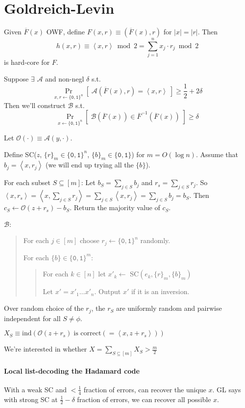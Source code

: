 \documentclass[11pt]{article}
\newcommand{\eqdef}{\ensuremath{\equiv}}
\newcommand{\bit}{\ensuremath{\{\texttt{0},\texttt{1}\}}}
\newcommand{\ang}[1]{\ensuremath{\left\langle#1\right\rangle}}
\newcommand{\abs}[1]{{\ensuremath{\left\vert#1\right\vert}}}
\newcommand{\AAA}{\ensuremath{\mathcal{A}}}
\newcommand{\BBB}{\ensuremath{\mathcal{B}}}
\newcommand{\OOO}{\ensuremath{\mathcal{O}}}
\theoremstyle{remark}
\begin{document}
\section{Goldreich-Levin}

Given $\overline{F}(x)$ OWF, define $F(x,r)\eqdef(\overline{F}(x), r)$ for $\abs{x}=\abs{r}$.
Then \[ h(x,r)\eqdef \ang{x,r} \bmod 2 = \sum_{j=1}^n x_j \cdot r_j \bmod 2 \]
is hard-core for $F$.

Suppose $\exists$ $\AAA$ and non-negl $\delta$ s.t. \[
\Pr_{x,r\gets\bit^n}[\;\AAA(\overline{F}(x), r) = \ang{x,r}\;] \ge \frac{1}{2} + 2\delta
\]
Then we'll construct $\BBB$ s.t. \[
\Pr_{x\gets\bit^n}[\;\BBB(\overline{F}(x)) \in \overline{F}^{-1}(\overline{F}(x))\;] \ge \delta
\]

Let $\OOO(\cdot) \eqdef \AAA(y, \cdot)$.

Define SC($z$, $\{r\}_m\in\bit^n$, $\{b\}_m\in\bit$) for $m = O(\log n)$.
Assume that $b_j=\ang{x,r_j}$ (we will end up trying all the $\{b\}$).

For each subset $S \subseteq [m]$: Let $b_S = \sum_{j\in S} b_j$ and $r_s = \sum_{j\in S} r_j$.
So $\ang{x,r_s} = \ang{x,\sum_{j\in S} r_j} = \sum_{j\in S}\ang{x,r_j} = \sum_{j\in S} b_j = b_S$.
Then $c_S \gets \OOO(z+r_s) - b_S$. Return the majority value of $c_S$.

$\BBB$:
\begin{quote}
For each $j\in[m]$ choose $r_j\gets\bit^n$ randomly.

For each $\{b\}\in\bit^m$:
\begin{quote}
For each $k\in[n]$ let $x'_k \gets$ SC$(e_k, \{r\}_m, \{b\}_m)$

Let $x' = x'_1 \ldots x'_n$. Output $x'$ if it is an inversion.
\end{quote}
\end{quote}

Over random choice of the $r_j$, the $r_S$ are uniformly random
and pairwise independent for all $S \neq \phi$.

$X_S \eqdef \text{ind}(\OOO(z+r_s)\;\text{is correct}(=\ang{x,z+r_s}))$

We're interested in whether $X=\sum_{S\subseteq[m]} X_S > \frac{m}{2}$

\paragraph{Local list-decoding the Hadamard code}
With a weak SC and $<\frac{1}{4}$ fraction of errors, can recover the unique $x$.
GL says with strong SC at $\frac{1}{2}-\delta$ fraction of errors, we can
recover all possible $x$.
\end{document}

